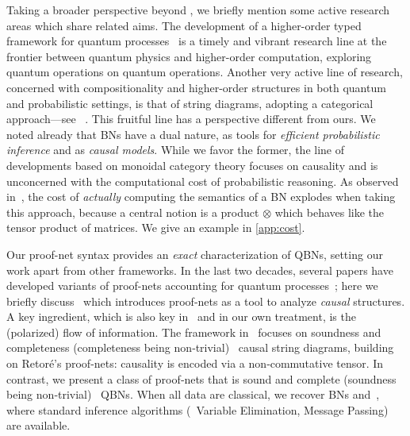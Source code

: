 Taking a broader perspective beyond \QBNs, we briefly mention some active research areas which share related aims. 
The development of a higher-order typed framework for quantum processes~\cite{10.1098/rspa.2018.0706,10.22331/q-2026-01-21-1978} is a timely and vibrant research line at the frontier between quantum physics and higher-order computation, exploring quantum operations on quantum operations.
Another very active line of research, concerned with compositionality and higher-order structures in both quantum and probabilistic settings, is that of string diagrams, adopting a categorical approach---see \eg~\cite{10.23638/LMCS-15(3:15)2019,10.4230/LIPIcs.MFCS.2022.80, simmons2024completelogiccausalconsistency}.
This fruitful line has a perspective different from ours.
We noted already that BNs have a dual nature, as tools for \emph{efficient probabilistic inference} and as \emph{causal models}.
While we favor the former, the line of developments based on monoidal category theory focuses on causality and is unconcerned with the computational cost of probabilistic reasoning.
As observed in~\cite[Example~9.7]{popl24}, the cost of \emph{actually} computing the semantics of a BN explodes when taking this approach, because a central notion is a product $\otimes$ which behaves like the tensor product of matrices.
We give an example in \cref{app:cost}. 

Our proof-net syntax provides an \emph{exact} characterization of QBNs, setting our work apart from other frameworks.
In the last two decades, several papers have developed variants of proof-nets accounting for quantum processes~\cite{DuncanThesis,AbramskyDuncan2009GeneralisedProofNets,esop2014,LagoFVY17,simmons2024completelogiccausalconsistency}; here we briefly discuss~\cite{simmons2024completelogiccausalconsistency} which introduces proof-nets as a tool to analyze \emph{causal} structures.
A key ingredient, which is also key in~\cite{popl24} and in our own treatment, is the (polarized) flow of information.
The framework in~\cite{simmons2024completelogiccausalconsistency} focuses on soundness and completeness (completeness being non‑trivial) \wrt\ causal string diagrams, building on Retoré’s proof-nets: causality is encoded via a non‑commutative tensor.
In contrast, we present a class of proof‑nets that is sound and complete (soundness being non‑trivial) \wrt\ QBNs.
When all data are classical, we recover BNs and~\cite{BPN}, where standard inference algorithms (\eg\ Variable Elimination, Message Passing) are available.
